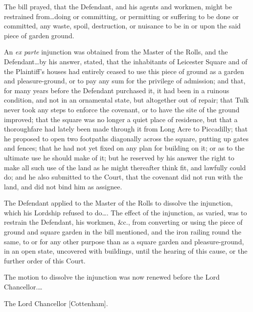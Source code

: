 The bill prayed, that the Defendant, and his agents and workmen, might be
restrained from\ldots doing or committing, or permitting or suffering to be done
or committed, any waste, spoil, destruction, or nuisance to be in or upon the
said piece of garden ground.

An \textit{ex parte} injunction was obtained from the Master of the Rolls, and
the Defendant\ldots by his answer, stated, that the inhabitants of Leicester
Square and of the Plaintiff's houses had entirely ceased to use this piece of
ground as a garden and pleasure-ground, or to pay any sum for the privilege of
admission; and that, for many years before the Defendant purchased it, it had
been in a ruinous condition, and not in an ornamental state, but altogether out
of repair; that Tulk never took any steps to enforce the covenant, or to have
the site of the ground improved; that the square was no longer a quiet place of
residence, but that a thoroughfare had lately been made through it from Long
Acre to Piccadilly; that he proposed to open two footpaths diagonally across the
square, putting up gates and fences; that he had not yet fixed on any plan for
building on it; or as to the ultimate use he should make of it; but he reserved
by his answer the right to make all such use of the land as he might thereafter
think fit, and lawfully could do; and he also submitted to the Court, that the
covenant did not run with the land, and did not bind him as assignee.

The Defendant applied to the Master of the Rolls to dissolve the injunction,
which his Lordship refused to do\ldots . The effect of the injunction, as
varied, was to restrain the Defendant, his workmen, \&c., from converting or
using the piece of ground and square garden in the bill mentioned, and the iron
railing round the same, to or for any other purpose than as a square garden and
pleasure-ground, in an open state, uncovered with buildings, until the hearing
of this cause, or the further order of this Court.

The motion to dissolve the injunction was now renewed before the Lord
Chancellor.\ldots

\opinion The Lord Chancellor [Cottenham].

